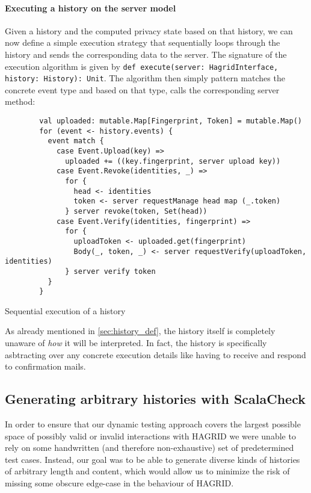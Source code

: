 \paragraph{Executing a history on the server model}
Given a history and the computed privacy state based on that history, we can now define a simple execution strategy that sequentially loops through the history and sends the corresponding data to the server.
The signature of the execution algorithm is given by \texttt{def execute(server: HagridInterface, history: History): Unit}.
The algorithm then simply pattern matches the concrete event type and based on that type, calls the corresponding server method: 
\begin{code}
    \begin{verbatim}
        val uploaded: mutable.Map[Fingerprint, Token] = mutable.Map()
        for (event <- history.events) {
          event match {
            case Event.Upload(key) =>
              uploaded += ((key.fingerprint, server upload key))
            case Event.Revoke(identities, _) =>
              for {
                head <- identities
                token <- server requestManage head map (_.token)
              } server revoke(token, Set(head))
            case Event.Verify(identities, fingerprint) =>
              for {
                uploadToken <- uploaded.get(fingerprint)
                Body(_, token, _) <- server requestVerify(uploadToken, identities)
              } server verify token
          }
        }
    \end{verbatim}
    \caption{Sequential execution of a history}
\end{code}

As already mentioned in \ref{sec:history_def}, the history itself is completely unaware of \emph{how} it will be interpreted. In fact, the history is specifically asbtracting over any concrete execution details like having to receive and respond to confirmation mails.


\newpage

\subsection{Generating arbitrary histories with ScalaCheck}
In order to ensure that our dynamic testing approach covers the largest possible space of possibly valid or invalid interactions with HAGRID we were unable to rely on some handwritten (and therefore non-exhaustive) set of predetermined test cases. Instead, our goal was to be able to generate diverse kinds of histories of arbitrary length and content, which would allow us to minimize the risk of missing some obscure edge-case in the behaviour of HAGRID.

